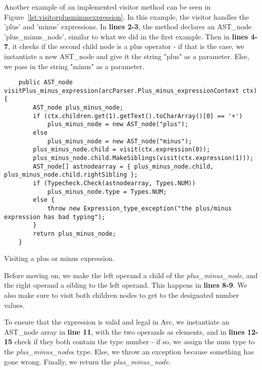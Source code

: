 Another example of an implemented visitor method can be seen in Figure~\ref{lst:visitorplusminusexpression}. In this example, the visitor handles the 'plus' and 'minus' expressions. In \textbf{lines 2-3}, the method declares an AST\_node 'plus\_minus\_node', similar to what we did in the first example. Then in \textbf{lines 4-7}, it checks if the second child node is a plus operator - if that is the case, we instantiate a new AST\_node and give it the string "plus" as a parameter. Else, we pass in the string "minus" as a parameter.


\begin{listing}[htb!]
    \begin{verbatim}
    public AST_node visitPlus_minus_expression(arcParser.Plus_minus_expressionContext ctx) {
        AST_node plus_minus_node;
        if (ctx.children.get(1).getText().toCharArray()[0] == '+')
            plus_minus_node = new AST_node("plus");
        else
            plus_minus_node = new AST_node("minus");
        plus_minus_node.child = visit(ctx.expression(0));
        plus_minus_node.child.MakeSiblings(visit(ctx.expression(1)));
        AST_node[] astnodearray = { plus_minus_node.child, plus_minus_node.child.rightSibling };
        if (Typecheck.Check(astnodearray, Types.NUM))
            plus_minus_node.type = Types.NUM;
        else {
            throw new Expression_type_exception("the plus/minus expression has bad typing");
        }
        return plus_minus_node;
    }
    \end{verbatim}
    \caption{Visiting a plus or minus expression.}
    \label{lst:visitorplusminusexpression}
\end{listing}


Before moving on, we make the left operand a child of the \textit{plus\_minus\_node}, and the right operand a sibling to the left operand. This happens in \textbf{lines 8-9}. We also make sure to visit both children nodes to get to the designated number values.

To ensure that the expression is valid and legal in Arc, we instantiate an AST\_node array in \textbf{line 11}, with the two operands as elements, and in \textbf{lines 12-15} check if they both contain the type number - if so, we assign the num type to the \textit{plus\_minus\_node}s type. Else, we throw an exception because something has gone wrong. Finally, we return the \textit{plus\_minus\_node}.